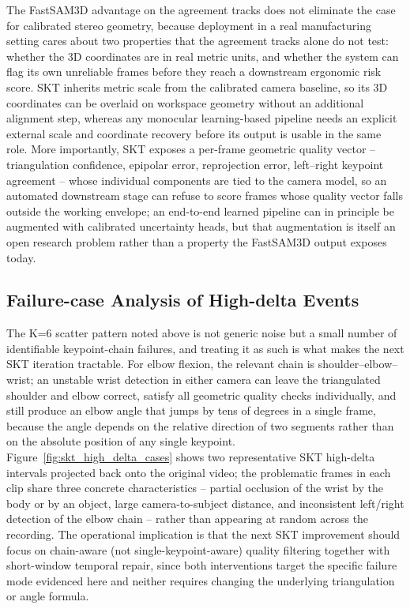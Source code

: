 \documentclass[12pt,a4paper]{article}
\begin{document}
The FastSAM3D advantage on the agreement tracks does not eliminate the
case for calibrated stereo geometry, because deployment in a real
manufacturing setting cares about two properties that the agreement
tracks alone do not test: whether the 3D coordinates are in real metric
units, and whether the system can flag its own unreliable frames before
they reach a downstream ergonomic risk score.
SKT inherits metric scale from the calibrated camera baseline, so its 3D
coordinates can be overlaid on workspace geometry without an additional
alignment step, whereas any monocular learning-based pipeline needs an
explicit external scale and coordinate recovery before its output is
usable in the same role.
More importantly, SKT exposes a per-frame geometric quality vector --
triangulation confidence, epipolar error, reprojection error,
left--right keypoint agreement -- whose individual components are tied
to the camera model, so an automated downstream stage can refuse to
score frames whose quality vector falls outside the working envelope;
an end-to-end learned pipeline can in principle be augmented with
calibrated uncertainty heads, but that augmentation is itself an open
research problem rather than a property the FastSAM3D output exposes
today.

\subsection{Failure-case Analysis of High-delta Events}

The K=6 scatter pattern noted above is not generic noise but a small
number of identifiable keypoint-chain failures, and treating it as
such is what makes the next SKT iteration tractable.
For elbow flexion, the relevant chain is shoulder--elbow--wrist; an
unstable wrist detection in either camera can leave the triangulated
shoulder and elbow correct, satisfy all geometric quality checks
individually, and still produce an elbow angle that jumps by tens of
degrees in a single frame, because the angle depends on the relative
direction of two segments rather than on the absolute position of any
single keypoint.
Figure~\ref{fig:skt_high_delta_cases} shows two representative SKT
high-delta intervals projected back onto the original video; the
problematic frames in each clip share three concrete characteristics --
partial occlusion of the wrist by the body or by an object, large
camera-to-subject distance, and inconsistent left/right detection of
the elbow chain -- rather than appearing at random across the
recording.
The operational implication is that the next SKT improvement should
focus on chain-aware (not single-keypoint-aware) quality filtering
together with short-window temporal repair, since both interventions
target the specific failure mode evidenced here and neither requires
changing the underlying triangulation or angle formula.
\end{document}
